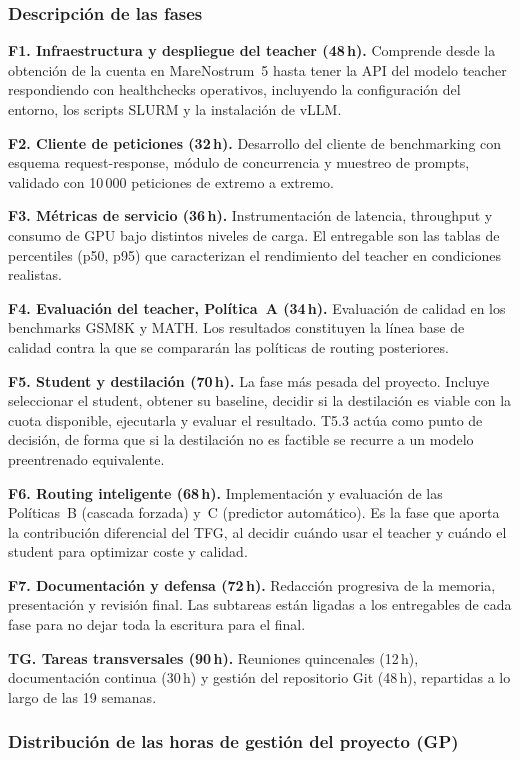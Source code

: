 \documentclass[11pt,a4paper]{article}
\begin{document}
\subsubsection{Descripción de las fases}

\textbf{F1. Infraestructura y despliegue del teacher (48\,h).} Comprende desde la obtención de la cuenta en MareNostrum~5 hasta tener la API del modelo teacher respondiendo con healthchecks operativos, incluyendo la configuración del entorno, los scripts SLURM y la instalación de vLLM.

\textbf{F2. Cliente de peticiones (32\,h).} Desarrollo del cliente de benchmarking con esquema request-response, módulo de concurrencia y muestreo de prompts, validado con 10\,000 peticiones de extremo a extremo.

\textbf{F3. Métricas de servicio (36\,h).} Instrumentación de latencia, throughput y consumo de GPU bajo distintos niveles de carga. El entregable son las tablas de percentiles (p50, p95) que caracterizan el rendimiento del teacher en condiciones realistas.

\textbf{F4. Evaluación del teacher, Política~A (34\,h).} Evaluación de calidad en los benchmarks GSM8K y MATH. Los resultados constituyen la línea base de calidad contra la que se compararán las políticas de routing posteriores.

\textbf{F5. Student y destilación (70\,h).} La fase más pesada del proyecto. Incluye seleccionar el student, obtener su baseline, decidir si la destilación es viable con la cuota disponible, ejecutarla y evaluar el resultado. T5.3 actúa como punto de decisión, de forma que si la destilación no es factible se recurre a un modelo preentrenado equivalente.

\textbf{F6. Routing inteligente (68\,h).} Implementación y evaluación de las Políticas~B (cascada forzada) y~C (predictor automático). Es la fase que aporta la contribución diferencial del TFG, al decidir cuándo usar el teacher y cuándo el student para optimizar coste y calidad.

\textbf{F7. Documentación y defensa (72\,h).} Redacción progresiva de la memoria, presentación y revisión final. Las subtareas están ligadas a los entregables de cada fase para no dejar toda la escritura para el final.

\textbf{TG. Tareas transversales (90\,h).} Reuniones quincenales (12\,h), documentación continua (30\,h) y gestión del repositorio Git (48\,h), repartidas a lo largo de las 19 semanas.

\subsubsection{Distribución de las horas de gestión del proyecto (GP)}
\end{document}
